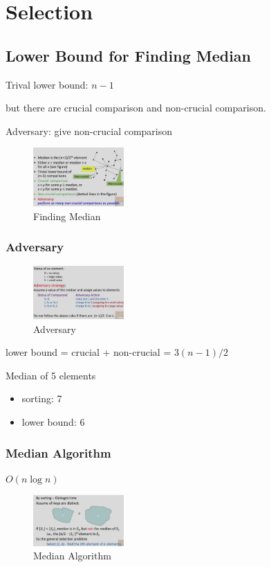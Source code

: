 \newpage
\section{Selection}%
\subsection{Lower Bound for Finding Median}

Trival lower bound: $n-1$

but there are crucial comparison and non-crucial comparison.

Adversary: give non-crucial comparison

\begin{figure}[H]
    \centering
    \includegraphics[width=0.309\textwidth]{pic/DAA3/Finding Median}
    \caption{Finding Median}
\end{figure}

\subsubsection{Adversary}
\begin{figure}[H]
    \centering
    \includegraphics[width=0.309\textwidth]{pic/DAA3/Adversary}
    \caption{Adversary}
\end{figure}

lower bound = crucial + non-crucial = $3(n-1)/2$

\begin{example}
    Median of 5 elements
    \begin{itemize}
        \item sorting: 7
        \item lower bound: 6
    \end{itemize}
\end{example}

\subsubsection{Median Algorithm}
$O(n\log n)$
\begin{figure}[H]
    \centering
    \includegraphics[width=0.309\textwidth]{pic/DAA3/Median Algorithm}
    \caption{Median Algorithm}
\end{figure}


